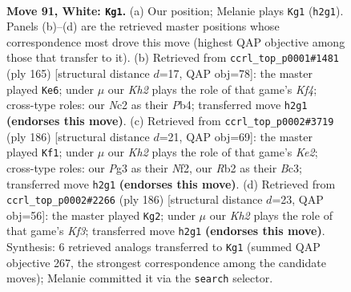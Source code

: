 \documentclass[11pt]{article}
\begin{document}
\clearpage

\begin{figure}[p]\centering
\begin{subfigure}{0.46\textwidth}\centering
\resizebox{\linewidth}{!}{%
\newchessgame
\chessboard[
  setfen={8/6p1/5p2/5k1p/7P/6P1/1RNr3K/8 w - - 6 91},
  showmover=false,
  pgfstyle=straightmove, color=movearrow, markmove={h2-g1}
]}
\caption{}
\end{subfigure}\hfill
\begin{subfigure}{0.46\textwidth}\centering
\resizebox{\linewidth}{!}{%
\newchessgame
\chessboard[
  setfen={8/8/8/1R3k1p/1p4pP/3P2P1/4K3/1r6 b - - 5 83},
  showmover=false,
  pgfstyle=straightmove, color=movearrow, markmove={f5-e6}
]}
\caption{}
\end{subfigure}
\\[4pt]
\begin{subfigure}{0.46\textwidth}\centering
\resizebox{\linewidth}{!}{%
\newchessgame
\chessboard[
  setfen={8/6k1/5p2/4pP2/2p3P1/2B5/r3KN2/8 w - - 42 94},
  showmover=false,
  pgfstyle=straightmove, color=movearrow, markmove={e2-f1}
]}
\caption{}
\end{subfigure}\hfill
\begin{subfigure}{0.46\textwidth}\centering
\resizebox{\linewidth}{!}{%
\newchessgame
\chessboard[
  setfen={5r2/8/R5pk/7p/7P/5KP1/8/8 w - - 74 94},
  showmover=false,
  pgfstyle=straightmove, color=movearrow, markmove={f3-g2}
]}
\caption{}
\end{subfigure}
\caption{\textbf{Move 91, White: \texttt{Kg1}.} (a) Our position; Melanie plays \texttt{Kg1} (\texttt{h2g1}). Panels (b)--(d) are the retrieved master positions whose correspondence most drove this move (highest QAP objective among those that transfer to it). (b) Retrieved from \texttt{ccrl\_top\_p0001\#1481} (ply 165) [structural distance $d$=17, QAP obj=78]: the master played \texttt{Ke6}; under $\mu$ our \emph{Kh2} plays the role of that game's \emph{Kf4}; cross-type roles: our \emph{N}c2 as their \emph{P}b4; transferred move \texttt{h2g1} \textbf{(endorses this move)}. (c) Retrieved from \texttt{ccrl\_top\_p0002\#3719} (ply 186) [structural distance $d$=21, QAP obj=69]: the master played \texttt{Kf1}; under $\mu$ our \emph{Kh2} plays the role of that game's \emph{Ke2}; cross-type roles: our \emph{P}g3 as their \emph{N}f2, our \emph{R}b2 as their \emph{B}c3; transferred move \texttt{h2g1} \textbf{(endorses this move)}. (d) Retrieved from \texttt{ccrl\_top\_p0002\#2266} (ply 186) [structural distance $d$=23, QAP obj=56]: the master played \texttt{Kg2}; under $\mu$ our \emph{Kh2} plays the role of that game's \emph{Kf3}; transferred move \texttt{h2g1} \textbf{(endorses this move)}. Synthesis: 6 retrieved analogs transferred to \texttt{Kg1} (summed QAP objective 267, the strongest correspondence among the candidate moves); Melanie committed it via the \texttt{search} selector.}
\label{fig:thought-m180}
\end{figure}
\end{document}
